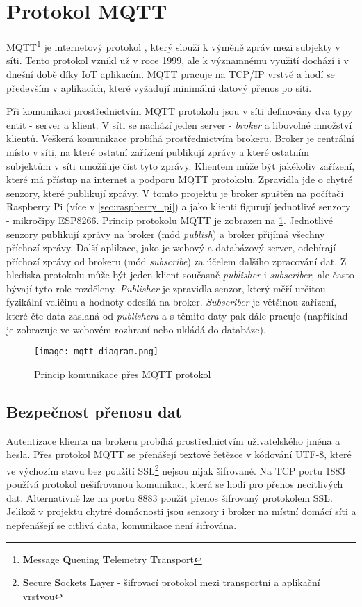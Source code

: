 \section{Protokol MQTT} \label{sec:protocol_mqtt}
MQTT\footnote{\textbf{M}essage \textbf{Q}ueuing \textbf{T}elemetry \textbf{T}ransport} je internetový protokol \cite{IoT-MQTT-prakticky:online}, který slouží k výměně zpráv mezi subjekty v síti. Tento protokol vznikl už v roce 1999, ale k významnému využití dochází i v dnešní době díky IoT aplikacím. MQTT pracuje na TCP/IP vrstvě a hodí se především v aplikacích, které vyžadují minimální datový přenos po síti.  \par
Při komunikaci prostřednictvím MQTT protokolu jsou v síti definovány dva typy entit - server a klient. V síti se nachází jeden server - \textit{broker} a libovolné množství klientů. Veškerá komunikace probíhá prostřednictvím brokeru. Broker je centrální místo v síti, na které ostatní zařízení publikují zprávy a které ostatním subjektům v síti umožňuje číst tyto zprávy. Klientem může být jakékoliv zařízení, které má přístup na internet a podporu MQTT protokolu. Zpravidla jde o chytré senzory, které publikují zprávy. V tomto projektu je broker spuštěn na počítači Raspberry Pi (více v \cref{sec:raspberry_pi}) a jako klienti figurují jednotlivé senzory - mikročipy ESP8266. Princip protokolu MQTT je zobrazen na \cref{fig:mqtt_communication}. Jednotlivé senzory publikují zprávy na broker (mód \textit{publish}) a broker přijímá všechny příchozí zprávy. Další aplikace, jako je webový a databázový server, odebírají příchozí zprávy od brokeru (mód \textit{subscribe}) za účelem dalšího zpracování dat. Z hlediska protokolu může být jeden klient současně \textit{publisher} i \textit{subscriber}, ale často bývají tyto role rozděleny. \textit{Publisher} je zpravidla senzor, který měří určitou fyzikální veličinu a hodnoty odesílá na broker. \textit{Subscriber} je většinou zařízení, které čte data zaslaná od \textit{publishera} a s těmito daty pak dále pracuje (například je zobrazuje ve webovém rozhraní nebo ukládá do databáze). 

\begin{figure}[H]
  \centering
  \texttt{[image: mqtt\_diagram.png]}
  \caption{Princip komunikace přes MQTT protokol}
  \label{fig:mqtt_communication}
\end{figure}

\subsection*{Bezpečnost přenosu dat}
Autentizace klienta na brokeru probíhá prostřednictvím uživatelského jména a hesla. Přes protokol MQTT se přenášejí textové řetězce v kódování UTF-8, které ve výchozím stavu bez použití SSL\footnote{\textbf{S}ecure \textbf{S}ockets \textbf{L}ayer - šifrovací protokol mezi transportní a aplikační vrstvou} nejsou nijak šifrované. Na TCP portu 1883 používá protokol nešifrovanou komunikaci, která se hodí pro přenos necitlivých dat. Alternativně lze na portu 8883 použít přenos šifrovaný protokolem SSL. Jelikož v projektu chytré domácnosti jsou senzory i broker na místní domácí síti a nepřenášejí se citlivá data, komunikace není šifrována.

